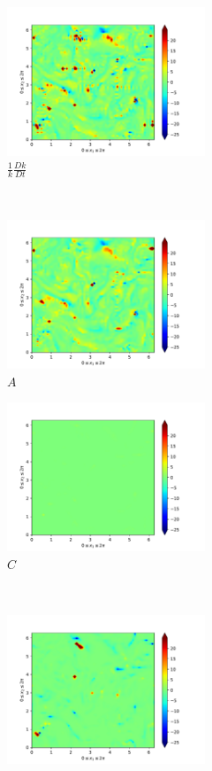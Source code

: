 \begin{figure}[H]
    \begin{subfigure}[H]{0.45\textwidth}
        \includegraphics[height=1.75in]{media/run-cds-65/ke-1310}
        \caption{$\frac{1}{k} \frac{D k}{Dt}$}
    \end{subfigure}
    ~
    \begin{subfigure}{0.45\textwidth}
        \includegraphics[height=1.75in]{media/run-cds-65/A-ke-1310}
        \caption{$A$}
    \end{subfigure}
    \newline
    \begin{subfigure}{0.45\textwidth}
        \includegraphics[height=1.75in]{media/run-cds-65/C-ke-1310}
        \caption{$C$}
    \end{subfigure}
    ~
    \begin{subfigure}{0.45\textwidth}
        \includegraphics[height=1.75in]{media/run-cds-65/P-ke-1310}

\end{subfigure}
\end{figure}
